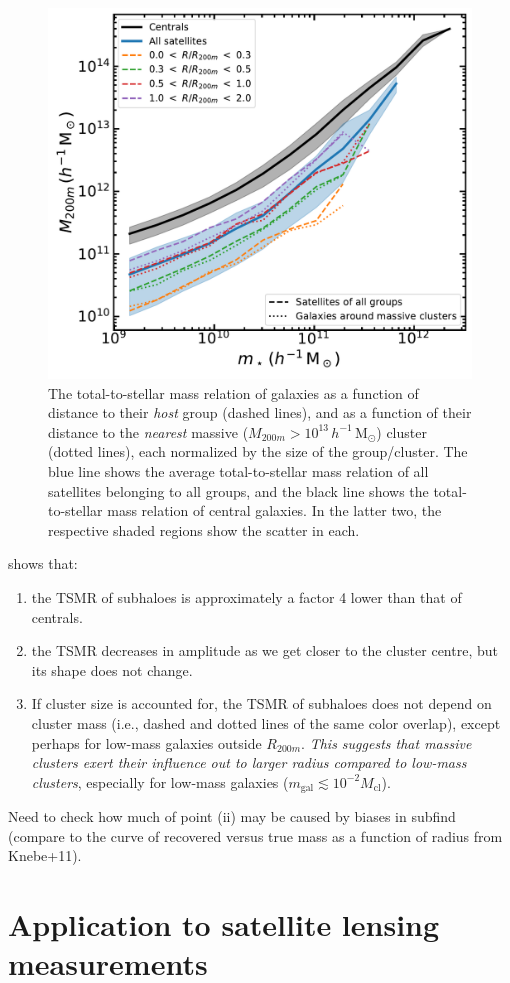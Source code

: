 \documentclass[usenatbib,fleqn]{mnras}
\newcommand{\Msun}{\mathrm{M}_\odot}
\begin{document}
\begin{figure}
  \centerline{\includegraphics[width=\linewidth]{total_to_stellar_groups_and_clusters.pdf}}
\caption{The total-to-stellar mass relation of galaxies as a function of distance to their \emph{host} group (dashed lines), and as a function of their distance to the \emph{nearest} massive ($M_{200m}>10^{13}\,h^{-1}\,\Msun$) cluster (dotted lines), each normalized by the size of the group/cluster. The blue line shows the average total-to-stellar mass relation of all satellites belonging to all groups, and the black line shows the total-to-stellar mass relation of central galaxies. In the latter two, the respective shaded regions show the scatter in each.}
\label{f:relation}
\end{figure}

 shows that:
\begin{enumerate}
  \item the TSMR of subhaloes is approximately a factor 4 lower than that of centrals.
  \item the TSMR decreases in amplitude as we get closer to the cluster centre, but its shape does not change.
  \item If cluster size is accounted for, the TSMR of subhaloes does not depend on cluster mass (i.e., dashed and dotted lines of the same color overlap), except perhaps for low-mass galaxies outside $R_{200m}$. \emph{This suggests that massive clusters exert their influence out to larger radius compared to low-mass clusters}, especially for low-mass galaxies ($m_\mathrm{gal}\lesssim10^{-2}M_\mathrm{cl}$).
\end{enumerate}

Need to check how much of point (ii) may be caused by biases in subfind (compare to the curve of recovered versus true mass as a function of radius from Knebe+11).


\section{Application to satellite lensing measurements}




\end{document}
